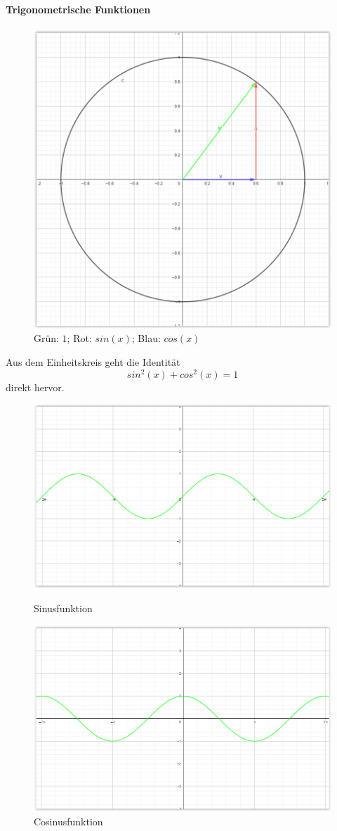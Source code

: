 \documentclass[12pt,a4paper]{article}%
\numberwithin{equation}{section}
\newcommand{\subsubsubsection}{\paragraph}
\numberwithin{equation}{subsection}
\begin{document}
		\subsubsubsection{Trigonometrische Funktionen}
		\begin{figure}[H]
		  \centering
		  \includegraphics[width=0.35\linewidth]{funktionen_einheitskreis_sin_cos.png}
		  \caption{Grün: $1$; Rot: $sin(x)$; Blau: $cos(x)$}
		  \label{fig:funkt_e_ln}
		\end{figure}
		Aus dem Einheitskreis geht die Identität
		\begin{equation}
		  sin^2(x) + cos^2(x) = 1
		\end{equation}
		direkt hervor.
		\begin{figure}[H] 
		\centering
		\begin{minipage}{.5\textwidth}
		  \centering
		  \includegraphics[width=0.9\linewidth]{funktionen_sin.png}
		  \caption{Sinusfunktion}
		  \label{fig:funkt_sin}
		\end{minipage}%
		\begin{minipage}{.5\textwidth}
		  \centering
		  \includegraphics[width=0.9\linewidth]{funktionen_cos.png}
		  \caption{Cosinusfunktion}
		  \label{fig:funkt_cos}
		\end{minipage}
		\end{figure}
\end{document}

